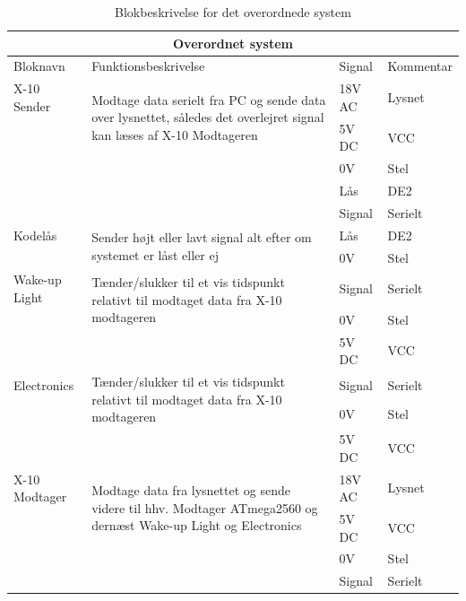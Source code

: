 \documentclass[11pt]{article}
\begin{document}
\begin{table}[H]
\centering
	\begin{tabular}{l|p{10cm}|l|l}

	\toprule[0.4mm] \midrule
	\multicolumn{4}{c}{\textbf{Overordnet system}}\\
	\midrule[0.4mm] Bloknavn & Funktionsbeskrivelse & Signal & Kommentar\\ 
	\midrule[0.3mm]
	X-10 Sender & \multirow{2}{10cm}{Modtage data serielt fra PC og sende data over lysnettet, således det overlejret signal kan læses af X-10 Modtageren     \vfill} & 18V AC & Lysnet\\
	 & & 5V DC & VCC\\
	 & & 0V & Stel\\
	 & & Lås & DE2\\
	 & & Signal & Serielt\\
	 \midrule
	 Kodelås & \multirow{2}{10cm}{Sender højt eller lavt signal alt efter om systemet er låst eller ej  \vfill}& Lås & DE2\\
	 & & 0V & Stel\\
	 \midrule
	 Wake-up Light & \multirow{2}{10cm}{Tænder/slukker til et vis tidspunkt relativt til modtaget data fra X-10 modtageren \vfill}  & Signal & Serielt\\
	 & & 0V & Stel\\
	 & & 5V DC & VCC\\
	 \midrule
	 Electronics & \multirow{2}{10cm}{Tænder/slukker til et vis tidspunkt relativt til modtaget data fra X-10 modtageren \vfill}  & Signal & Serielt\\
	 & & 0V & Stel\\
	 & & 5V DC & VCC\\
	 \midrule
	 X-10 Modtager & \multirow{2}{10cm}{Modtage data fra lysnettet og sende videre til hhv. Modtager ATmega2560 og dernæst Wake-up Light og Electronics \vfill} & 18V AC & Lysnet\\
	 & & 5V DC & VCC\\
	 & & 0V & Stel\\
	 & & Signal & Serielt\\
	 \midrule\bottomrule[0.4mm]

	\end{tabular}
	\caption{Blokbeskrivelse for det overordnede system}
	\label{tab: Bloktabel}
\end{table}

\end{document}

